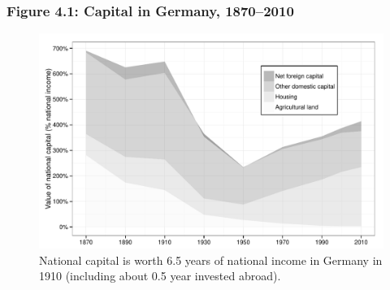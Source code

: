 \documentclass[t]{beamer}\usepackage[]{graphicx}\usepackage[]{color}
\newenvironment{knitrout}{}{} %
\begin{document}
\begin{frame}[label=Figure_4_1]
\frametitle{Figure 4.1: Capital in Germany, 1870--2010}
\begin{figure}[t]
\begin{minipage}[b]{\textwidth}
\centering
\begin{knitrout}\footnotesize
{}\color{fgcolor}

{\centering \includegraphics[width=1\linewidth]{figures/bw/Figure_4_1} 

}



\end{knitrout}
\caption{National capital is worth 6.5 years of national income in Germany in 1910 (including about 0.5 year invested abroad).}
\end{minipage}
\end{figure}
\end{frame}
\end{document}
